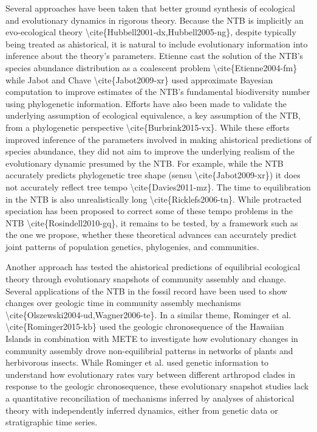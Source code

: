 \documentclass[]{article}
\begin{document}
Several approaches have been taken that better ground synthesis of
ecological and evolutionary dynamics in rigorous theory. Because the NTB
is implicitly an evo-ecological theory
\textbackslash{}cite\{Hubbell2001-dx,Hubbell2005-ng\}, despite typically
being treated as ahistorical, it is natural to include evolutionary
information into inference about the theory's parameters. Etienne cast
the solution of the NTB's species abundance distribution as a coalescent
problem \textbackslash{}cite\{Etienne2004-fm\} while Jabot and Chave
\textbackslash{}cite\{Jabot2009-xr\} used approximate Bayesian
computation to improve estimates of the NTB's fundamental biodiversity
number using phylogenetic information. Efforts have also been made to
validate the underlying assumption of ecological equivalence, a key
assumption of the NTB, from a phylogenetic perspective
\textbackslash{}cite\{Burbrink2015-vx\}. While these efforts improved
inference of the parameters involved in making ahistorical predictions
of species abundance, they did not aim to improve the underlying realism
of the evolutionary dynamic presumed by the NTB. For example, while the
NTB accurately predicts phylogenetic tree shape (sensu
\textbackslash{}cite\{Jabot2009-xr\}) it does not accurately reflect
tree tempo \textbackslash{}cite\{Davies2011-mz\}. The time to
equilibration in the NTB is also unrealistically long
\textbackslash{}cite\{Ricklefs2006-tn\}. While protracted speciation has
been proposed to correct some of these tempo problems in the NTB
\textbackslash{}cite\{Rosindell2010-gq\}, it remains to be tested, by a
framework such as the one we propose, whether these theoretical advances
can accurately predict joint patterns of population genetics,
phylogenies, and communities.

Another approach has tested the ahistorical predictions of equilibrial
ecological theory through evolutionary snapshots of community assembly
and change. Several applications of the NTB in the fossil record have
been used to show changes over geologic time in community assembly
mechanisms \textbackslash{}cite\{Olszewski2004-ud,Wagner2006-te\}. In a
similar theme, Rominger et al. \textbackslash{}cite\{Rominger2015-kb\}
used the geologic chronosequence of the Hawaiian Islands in combination
with METE to investigate how evolutionary changes in community assembly
drove non-equilibrial patterns in networks of plants and herbivorous
insects. While Rominger et al. used genetic information to understand
how evolutionary rates vary between different arthropod clades in
response to the geologic chronosequence, these evolutionary snapshot
studies lack a quantitative reconciliation of mechanisms inferred by
analyses of ahistorical theory with independently inferred dynamics,
either from genetic data or stratigraphic time series.
\end{document}
